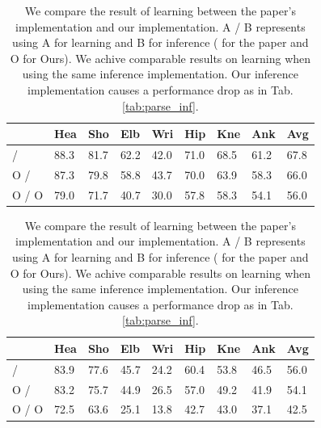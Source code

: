 \documentclass[10pt,twocolumn,letterpaper]{article}
\begin{document}
\begin{table}
  \begin{adjustwidth}{-0.3cm}{}
  \begin{center}
    \begin{tabular}{|p{1.1cm}|p{0.5cm}|p{0.5cm}|p{0.5cm}|p{0.5cm}|p{0.5cm}|p{0.5cm}|p{0.5cm}||p{0.5cm}|}
      \hline
      	                	                         & Hea  & Sho  & Elb  & Wri  & Hip  & Kne  & Ank  & Avg  \\ \hline
      \hline
      \cite{Yang_PAMI2011} / \cite{Yang_PAMI2011} 	 & 88.3 & 81.7 & 62.2 & 42.0 & 71.0 & 68.5 & 61.2 & 67.8 \\ \hline
      O / \cite{Yang_PAMI2011}			  	 & 87.3 & 79.8 & 58.8 & 43.7 & 70.0 & 63.9 & 58.3 & 66.0 \\ \hline
      O / O			 		 	 & 79.0 & 71.7 & 40.7 & 30.0 & 57.8 & 58.3 & 54.1 & 56.0 \\ \hline
    \end{tabular}
    \caption*{Probability of correct keypoints (PCK).}
    \bigskip
    \begin{tabular}{|p{1.1cm}|p{0.5cm}|p{0.5cm}|p{0.5cm}|p{0.5cm}|p{0.5cm}|p{0.5cm}|p{0.5cm}||p{0.5cm}|}
      \hline
                                                    	 & Hea  & Sho  & Elb  & Wri  & Hip  & Kne  & Ank  & Avg \\ \hline
      \hline
      \cite{Yang_PAMI2011} / \cite{Yang_PAMI2011} 	 & 83.9 & 77.6 & 45.7 & 24.2 & 60.4 & 53.8 & 46.5 & 56.0 \\ \hline
      O / \cite{Yang_PAMI2011}			 	 & 83.2 & 75.7 & 44.9 & 26.5 & 57.0 & 49.2 & 41.9 & 54.1 \\ \hline
      O / O			 			 & 72.5 & 63.6 & 25.1 & 13.8 & 42.7 & 43.0 & 37.1 & 42.5 \\ \hline
    \end{tabular}
    \caption*{Average precision of keypoints (APK).}
  \end{center}
  \end{adjustwidth}
  \caption{We compare the result of learning between the paper's implementation and our implementation. A / B represents using A for learning and B for inference (\cite{Yang_PAMI2011} for the paper and O for Ours). We achive comparable results on learning when using the same inference implementation. Our inference implementation causes a performance drop as in Tab. \ref{tab:parse_inf}.}
  \label{tab:parse_learn}
\end{table}
\end{document}
